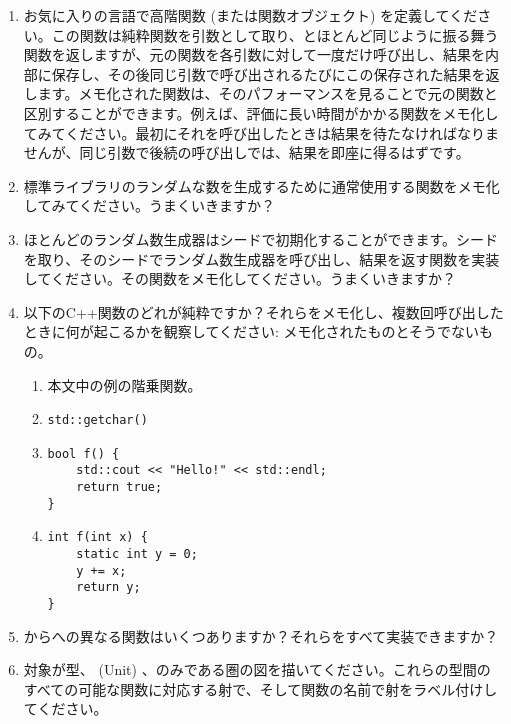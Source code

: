 \begin{enumerate}
  \tightlist
  \item
        お気に入りの言語で高階関数 (または関数オブジェクト) を定義してください。この関数は純粋関数を引数として取り、とほとんど同じように振る舞う関数を返しますが、元の関数を各引数に対して一度だけ呼び出し、結果を内部に保存し、その後同じ引数で呼び出されるたびにこの保存された結果を返します。メモ化された関数は、そのパフォーマンスを見ることで元の関数と区別することができます。例えば、評価に長い時間がかかる関数をメモ化してみてください。最初にそれを呼び出したときは結果を待たなければなりませんが、同じ引数で後続の呼び出しでは、結果を即座に得るはずです。
  \item
        標準ライブラリのランダムな数を生成するために通常使用する関数をメモ化してみてください。うまくいきますか？
  \item
        ほとんどのランダム数生成器はシードで初期化することができます。シードを取り、そのシードでランダム数生成器を呼び出し、結果を返す関数を実装してください。その関数をメモ化してください。うまくいきますか？
  \item
        以下のC++関数のどれが純粋ですか？それらをメモ化し、複数回呼び出したときに何が起こるかを観察してください: メモ化されたものとそうでないもの。

        \begin{enumerate}
          \tightlist
          \item
                本文中の例の階乗関数。
          \item
                \begin{verbatim}
std::getchar()
\end{verbatim}
          \item
                \begin{verbatim}
bool f() {
    std::cout << "Hello!" << std::endl;
    return true;
}
\end{verbatim}
          \item
                \begin{verbatim}
int f(int x) {
    static int y = 0;
    y += x;
    return y;
}
\end{verbatim}
        \end{enumerate}
  \item
        からへの異なる関数はいくつありますか？それらをすべて実装できますか？
  \item
        対象が型、\code{()} (Unit) 、のみである圏の図を描いてください。これらの型間のすべての可能な関数に対応する射で、そして関数の名前で射をラベル付けしてください。
\end{enumerate}
